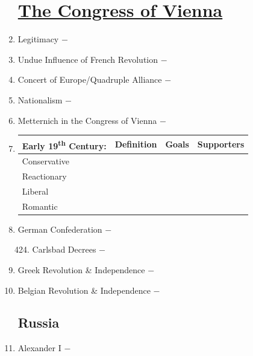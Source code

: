 \documentclass[12pt]{article}
\begin{document}
\begin{enumerate}
\begin{enumerate}[label=\arabic{*}.]
\end{enumerate}
\setcounter{enumi}{416}

\section{\underline{The Congress of Vienna}}

\item Legitimacy $-$ 

\item Undue Influence of French Revolution $-$ 

\item Concert of Europe/Quadruple Alliance $-$

\item Nationalism $-$

\item Metternich in the Congress of Vienna $-$

\item \begin{tabular}{l c c c}

\hline  
Early 19\textsuperscript{th} Century: & Definition & Goals & Supporters \\
\hline
Conservative & & & \\
\hline
Reactionary & & & \\
\hline
Liberal & & & \\
\hline
Romantic & & & \\
\hline

\end{tabular}

\item German Confederation $-$

\begin{enumerate}[label=\arabic{*}.]
\setcounter{enumii}{423}

\item Carlsbad Decrees $-$

\end{enumerate}
\setcounter{enumi}{424}

\item Greek Revolution \& Independence $-$

\item Belgian Revolution \& Independence $-$

\subsection{Russia}

\item Alexander I $-$ 


\end{enumerate}
\end{document}
